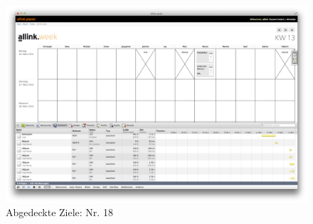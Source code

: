 \begin{figure}[htbp]
    \centering
        \includegraphics[height=0.85\textwidth,angle=90]{bilder/testing/tasks_sortieren.png}
    \caption{Abgedeckte Ziele: Nr. 18}
    \label{fig:bilder_testing_tasks_sortieren}
\end{figure}
\clearpage
